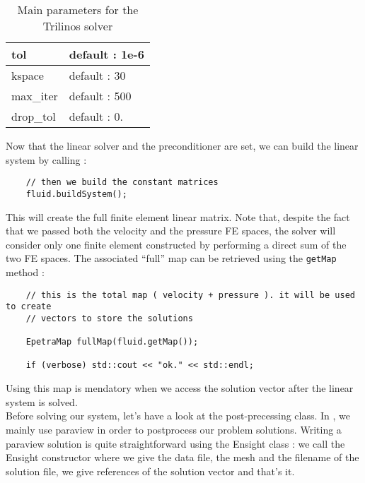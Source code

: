 {\begin{table}
\begin{center}
\begin{tabular}{|l|l|}
\hline

tol   & default : 1e-6  \\

\hline

kspace & default : 30  \\

\hline

max\_iter & default : 500  \\

\hline

drop\_tol & default : 0. \\

\hline

\end{tabular}
\end{center}
\caption{Main parameters for the Trilinos solver}
\label{table-solveroptions}
\end{table}

Now that the linear solver and the preconditioner are set, we can build the linear system by calling :
\begin{verbatim}
    // then we build the constant matrices
    fluid.buildSystem();
\end{verbatim}

This will create the full finite element linear matrix. Note that, despite the fact
that we passed both the velocity and the pressure FE spaces, the solver will consider
only one finite element constructed by performing a direct sum of the two FE spaces.
The associated ``full'' map can be retrieved using the \verb|getMap| method :

\begin{verbatim}
    // this is the total map ( velocity + pressure ). it will be used to create
    // vectors to store the solutions

    EpetraMap fullMap(fluid.getMap());

    if (verbose) std::cout << "ok." << std::endl;
\end{verbatim}

Using this map is mendatory when we access the solution vector after the linear system is solved.\\
Before solving our system, let's have a look at the post-precessing class.
In \lifev, we mainly use paraview in order to postprocess our problem solutions.
Writing a paraview solution is quite straightforward using the Ensight class :
we call the Ensight constructor where we give the data file, the mesh and the filename of the solution file,
we give references of the solution vector and that's it.

}
